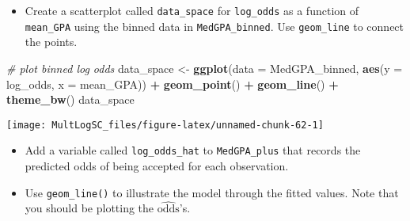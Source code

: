 \documentclass[
]{book}
\newenvironment{Shaded}{\begin{snugshade}}{\end{snugshade}}
\newcommand{\CommentTok}[1]{\textcolor[rgb]{0.56,0.35,0.01}{\textit{#1}}}
\newcommand{\DataTypeTok}[1]{\textcolor[rgb]{0.13,0.29,0.53}{#1}}
\newcommand{\DecValTok}[1]{\textcolor[rgb]{0.00,0.00,0.81}{#1}}
\newcommand{\KeywordTok}[1]{\textcolor[rgb]{0.13,0.29,0.53}{\textbf{#1}}}
\newcommand{\NormalTok}[1]{#1}
\newcommand{\OperatorTok}[1]{\textcolor[rgb]{0.81,0.36,0.00}{\textbf{#1}}}
\newcommand{\StringTok}[1]{\textcolor[rgb]{0.31,0.60,0.02}{#1}}
\providecommand{\tightlist}{%
  \setlength{\itemsep}{0pt}\setlength{\parskip}{0pt}}
\begin{document}
\begin{itemize}
\tightlist
\item
  Create a scatterplot called \texttt{data\_space} for \texttt{log\_odds} as a function of \texttt{mean\_GPA} using the binned data in \texttt{MedGPA\_binned}. Use \texttt{geom\_line} to connect the points.
\end{itemize}

\begin{Shaded}
\begin{Highlighting}[]
\CommentTok{# plot binned log odds}
\NormalTok{data_space <-}\StringTok{ }\KeywordTok{ggplot}\NormalTok{(}\DataTypeTok{data =}\NormalTok{ MedGPA_binned, }
\KeywordTok{aes}\NormalTok{(}\DataTypeTok{y =}\NormalTok{ log_odds, }\DataTypeTok{x =}\NormalTok{ mean_GPA)) }\OperatorTok{+}\StringTok{ }
\StringTok{    }\KeywordTok{geom_point}\NormalTok{() }\OperatorTok{+}
\StringTok{    }\KeywordTok{geom_line}\NormalTok{() }\OperatorTok{+}\StringTok{ }
\StringTok{    }\KeywordTok{theme_bw}\NormalTok{()}
\NormalTok{data_space}
\end{Highlighting}
\end{Shaded}

\begin{center}\texttt{[image: MultLogSC\_files/figure-latex/unnamed-chunk-62-1]} \end{center}

\begin{itemize}
\tightlist
\item
  Add a variable called \texttt{log\_odds\_hat} to \texttt{MedGPA\_plus} that records the predicted odds of being accepted for each observation.
\end{itemize}

\begin{Shaded}
\end{Shaded}

\begin{itemize}
\tightlist
\item
  Use \texttt{geom\_line()} to illustrate the model through the fitted values. Note that you should be plotting the \(\widehat{\text{odds}}\)'s.
\end{itemize}
\end{document}
